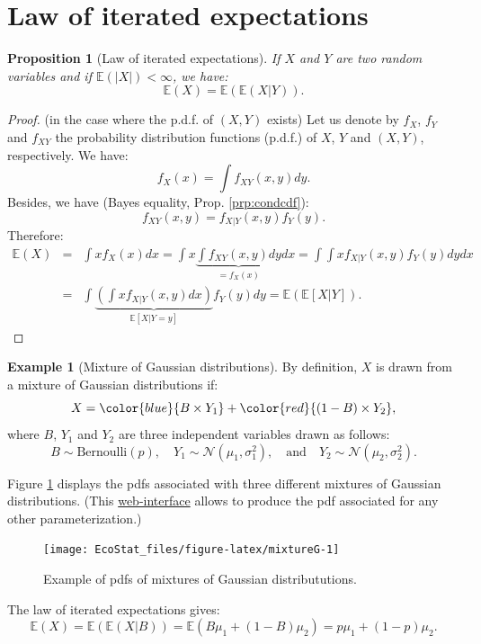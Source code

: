 \documentclass[
  12pt,
]{book}
\newtheorem{proposition}{Proposition}[chapter]
\theoremstyle{definition}
\theoremstyle{definition}
\newtheorem{example}{Example}[chapter]
\theoremstyle{definition}
\theoremstyle{definition}
\theoremstyle{remark}
\begin{document}
\hypertarget{law-of-iterated-expectations}{%
\section{Law of iterated expectations}\label{law-of-iterated-expectations}}

\begin{proposition}[Law of iterated expectations]
\protect\hypertarget{prp:lawiteratedexpect}{}\label{prp:lawiteratedexpect}If \(X\) and \(Y\) are two random variables and if \(\mathbb{E}(|X|)<\infty\), we have:
\[
\boxed{\mathbb{E}(X) = \mathbb{E}(\mathbb{E}(X|Y)).}
\]
\end{proposition}

\begin{proof}
(in the case where the p.d.f. of \((X,Y)\) exists) Let us denote by \(f_X\), \(f_Y\) and \(f_{XY}\) the probability distribution functions (p.d.f.) of \(X\), \(Y\) and \((X,Y)\), respectively. We have:
\[
f_{X}(x) = \int f_{XY}(x,y) dy.
\]
Besides, we have (Bayes equality, Prop. \ref{prp:condcdf}):
\[
f_{XY}(x,y) = f_{X|Y}(x,y)f_{Y}(y).
\]
Therefore:
\begin{eqnarray*}
\mathbb{E}(X) &=& \int x f_X(x)dx = \int x  \underbrace{ \int  f_{XY}(x,y) dy}_{=f_X(x)} dx =\int  \int x f_{X|Y}(x,y)f_{Y}(y) dydx \\
& = & \int \underbrace{\left(\int x f_{X|Y}(x,y)dx\right)}_{\mathbb{E}[X|Y=y]}f_{Y}(y) dy = \mathbb{E} \left( \mathbb{E}[X|Y] \right).
\end{eqnarray*}
\end{proof}

\begin{example}[Mixture of Gaussian distributions]
\protect\hypertarget{exm:mixture}{}\label{exm:mixture}By definition, \(X\) is drawn from a mixture of Gaussian distributions if:
\[
X = \color{blue}{B \times Y_1} + \color{red}{(1-B) \times Y_2},
\]
where \(B\), \(Y_1\) and \(Y_2\) are three independent variables drawn as follows:
\[
B \sim \mbox{Bernoulli}(p),\quad Y_1 \sim \mathcal{N}(\mu_1,\sigma_1^2), \quad \mbox{and}\quad Y_2 \sim \mathcal{N}(\mu_2,\sigma_2^2).
\]

Figure \ref{fig:mixtureG} displays the pdfs associated with three different mixtures of Gaussian distributions. (This \href{https://jrenne.shinyapps.io/density/}{web-interface} allows to produce the pdf associated for any other parameterization.)

\begin{figure}
\texttt{[image: EcoStat\_files/figure-latex/mixtureG-1]} \caption{Example of pdfs of mixtures of Gaussian distribututions.}\label{fig:mixtureG}
\end{figure}

The law of iterated expectations gives:
\[
\mathbb{E}(X) = \mathbb{E}(\mathbb{E}(X|B)) = \mathbb{E}(B\mu_1+(1-B)\mu_2)=p\mu_1 + (1-p)\mu_2.
\]
\end{example}
\end{document}
